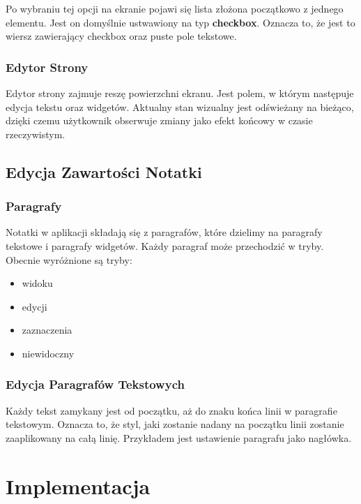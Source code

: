 \documentclass[shortabstract]{iithesis}
\begin{document}
Po wybraniu tej opcji na ekranie pojawi się lista złożona początkowo z jednego elementu.
Jest on domyślnie ustwawiony na typ \textbf{checkbox}. Oznacza to, że jest to wiersz zawierający checkbox oraz puste pole tekstowe.

\subsection{Edytor Strony}

Edytor strony zajmuje reszę powierzchni ekranu. Jest polem, w którym następuje edycja tekstu oraz widgetów. Aktualny stan wizualny jest odświeżany na bieżąco, dzięki czemu użytkownik obserwuje zmiany jako efekt końcowy w czasie rzeczywistym.



\section{Edycja Zawartości Notatki}

\subsection{Paragrafy}

Notatki w aplikacji składają się z paragrafów, które dzielimy na paragrafy tekstowe i paragrafy widgetów.
Każdy paragraf może przechodzić w tryby.
Obecnie wyróżnione są tryby:

\begin{itemize}
    \item widoku
    \item edycji
    \item zaznaczenia
    \item niewidoczny
\end{itemize}



\subsection{Edycja Paragrafów Tekstowych}

Każdy tekst zamykany jest od początku, aż do znaku końca linii w paragrafie tekstowym. Oznacza to, że styl, jaki zostanie nadany na początku linii zostanie zaaplikowany na całą linię. Przykładem jest ustawienie paragrafu jako nagłówka.



\chapter{Implementacja}


\end{document}
